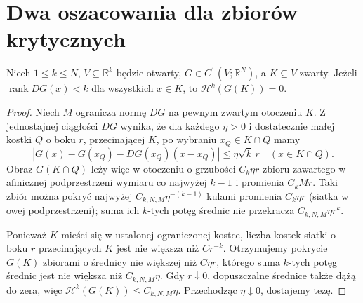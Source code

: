 \section{Dwa oszacowania dla zbiorów krytycznych}
\begin{lemat}
\label{lem:critical-area-null-28}
Niech $1\le k\le N$, $V\subseteq\mathbb R^k$ będzie
otwarty, $G\in C^1(V;\mathbb R^N)$, a
$K\subseteq V$ zwarty. Jeżeli
$\operatorname{rank}DG(x)<k$ dla wszystkich $x\in K$,
to $\mathcal H^k(G(K))=0$.
\end{lemat}
\begin{proof}
Niech $M$ ogranicza normę $DG$ na pewnym
zwartym otoczeniu $K$. Z jednostajnej ciągłości
$DG$ wynika, że dla każdego $\eta>0$ i dostatecznie
małej kostki $Q$ o boku $r$, przecinającej $K$,
po wybraniu $x_Q\in K\cap Q$ mamy
\[
 |G(x)-G(x_Q)-DG(x_Q)(x-x_Q)|\le\eta\sqrt k\,r
 \quad(x\in K\cap Q).
\]
Obraz $G(K\cap Q)$ leży więc w otoczeniu o
grzubości $C_k\eta r$ zbioru zawartego
w afinicznej podprzestrzeni wymiaru co najwyżej
$k-1$ i promienia $C_kMr$. Taki zbiór można
pokryć najwyżej $C_{k,N,M}\eta^{-(k-1)}$
kulami promienia $C_k\eta r$ (siatka w owej
podprzestrzeni); suma ich $k$-tych potęg
średnic nie przekracza $C_{k,N,M}\eta r^k$.

Ponieważ $K$ mieści się w ustalonej ograniczonej
kostce, liczba kostek siatki o boku $r$
przecinających $K$ jest nie większa niż $Cr^{-k}$.
Otrzymujemy pokrycie $G(K)$ zbiorami o średnicy
nie większej niż $C\eta r$, którego suma
$k$-tych potęg średnic jest nie większa niż
$C_{k,N,M}\eta$. Gdy $r\downarrow0$, dopuszczalne
średnice także dążą do zera, więc
$\mathcal H^k(G(K))\le C_{k,N,M}\eta$.
Przechodząc $\eta\downarrow0$, dostajemy tezę.
\end{proof}

